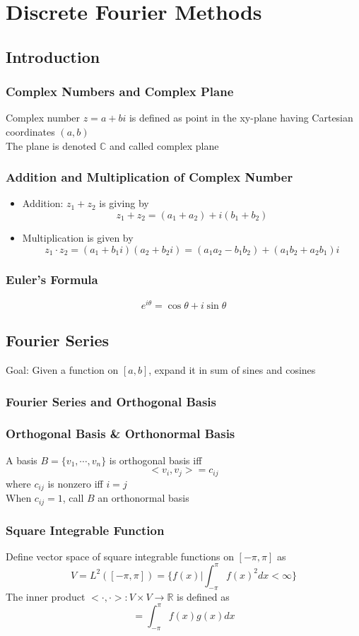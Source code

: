 \documentclass[11pt]{article}
\newcommand{\C}{{\mathbb{C}}}
\newcommand{\R}{{\mathbb{R}}}
\begin{document}
\section{Discrete Fourier Methods}
\subsection{Introduction}
\subsubsection*{Complex Numbers and Complex Plane}
Complex number $z=a+bi$ is defined as point in the xy-plane having Cartesian coordinates $(a,b)$ \\
The plane is denoted $\C$ and called complex plane 
\subsubsection*{Addition and Multiplication of Complex Number}
\begin{itemize}
  \item Addition: $z_1+z_2$ is giving by \[z_1+z_2 = (a_1+a_2)+i(b_1+b_2)\]
  \item Multiplication is given by \[z_1\cdot z_2 = (a_1+b_1i)(a_2+b_2i) = (a_1a_2-b_1b_2) + (a_1b_2+a_2b_1)i\]
\end{itemize}
\subsubsection*{Euler's Formula}
\[e^{i\theta} = \cos\theta + i\sin\theta\]
\subsection{Fourier Series}
Goal: Given a function on $[a,b]$, expand it in sum of sines and cosines
\subsubsection{Fourier Series and Orthogonal Basis}
\subsubsection*{Orthogonal Basis \& Orthonormal Basis}
A basis $B=\{v_1,\cdots,v_n\}$ is orthogonal basis iff \[<v_i,v_j> = c_{ij}\]
where $c_{ij}$ is nonzero iff $i=j$ \\
When $c_{ij}=1$, call $B$ an orthonormal basis 
\subsubsection*{Square Integrable Function}
Define vector space of square integrable functions on $[-\pi,\pi]$ as 
\[V = L^2([-\pi,\pi]) = \{f(x)|\int_{-\pi}^{\pi}f(x)^2dx<\infty\}\]
The inner product $<\cdot,\cdot>: V\times V\rightarrow\R$ is defined as 
\[<f,g>=\int_{-\pi}^{\pi}f(x)g(x)dx\]
\end{document}
